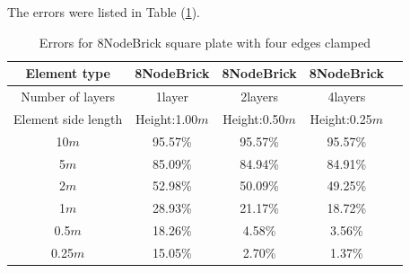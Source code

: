 \documentclass[fleqn,11pt,letter]{article}
\begin{document}
The errors were listed in Table (\ref{table Errors for 8NodeBrick square plate with four edges clamped}).

\begin{table}[H]
  \centering
  \caption{Errors for 8NodeBrick square plate with four edges clamped}
  \label{table Errors for 8NodeBrick square plate with four edges clamped}
\begin{tabular}{|c|c|c|c|c|}
\hline
Element type     & 8NodeBrick     & 8NodeBrick     & 8NodeBrick      \\ \hline
Number of layers & 1layer         & 2layers         & 4layers          \\ \hline
Element side length & Height:1.00$m$ & Height:0.50$m$ & Height:0.25$m$  \\ \hline
10$m$            & 95.57\%        & 95.57\%        & 95.57\%        \\ \hline
5$m$             & 85.09\%        & 84.94\%        & 84.91\%        \\ \hline
2$m$             & 52.98\%        & 50.09\%        & 49.25\%        \\ \hline
1$m$             & 28.93\%        & 21.17\%        & 18.72\%        \\ \hline
0.5$m$           & 18.26\%        & 4.58\%         & 3.56\%         \\ \hline
0.25$m$          & 15.05\%        & 2.70\%         & 1.37\%         \\
\hline
\end{tabular}
\end{table}



\end{document}
